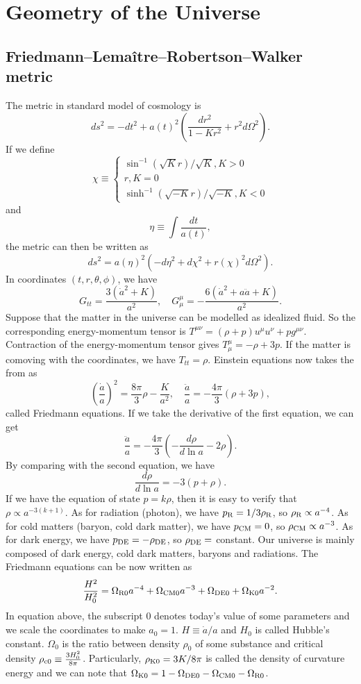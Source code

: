 \chapter{Geometry of the Universe}
\section{Friedmann–Lemaître–Robertson–Walker metric}
The metric in standard model of cosmology is
\[ds^2 = -dt^2 + a(t)^2 \left(\frac{dr^2}{1-Kr^2} + r^2 d\Omega^2 \right).\]
If we define
\[\chi \equiv \begin{cases} 
\sin^{-1}(\sqrt{K}r)/\sqrt{K}, K > 0 \\
r, K = 0 \\
\sinh^{-1}(\sqrt{-K}r)/\sqrt{-K}, K < 0
\end{cases}\]
and
\[\eta \equiv \int \frac{dt}{a(t)},\]
the metric can then be written as
\[ds^2 =  a(\eta)^2 \left(-d\eta^2 + d\chi^2 + r(\chi)^2 d\Omega^2 \right).\]
In coordinates $(t,r,\theta,\phi)$, we have
\[G_{tt} = \frac{3(\dot{a}^2+K)}{a^2}, \quad G^{\mu}_{\mu} = -\frac{6(\dot{a}^2+a\ddot{a}+K)}{a^2}.\]  
Suppose that the matter in the universe can be modelled as idealized fluid. So the corresponding energy-momentum tensor is $T^{\mu\nu} = (\rho + p) u^{\mu} u^{\nu} + pg^{\mu\nu}$. Contraction of the energy-momentum tensor gives $T^{\mu}_{\mu} = -\rho + 3p$. 
If the matter is comoving with the coordinates, we have $T_{tt} = \rho$. Einstein equations now takes the from as
\[\left(\frac{\dot{a}}{a} \right)^2 = \frac{8\pi}{3}\rho - \frac{K}{a^2}, \quad \frac{\ddot{a}}{a} = - \frac{4\pi}{3}(\rho + 3p),\]
called Friedmann equations. If we take the derivative of the first equation, we can get
\[\frac{\ddot{a}}{a} = -\frac{4\pi}{3}\left( - \frac{d\rho}{d \ln a} -2\rho \right).\]
By comparing with the second equation, we have
\[\frac{d\rho}{d \ln a} = -3(p+\rho).\]
If we have the equation of state $p = k\rho$, then it is easy to verify that $\rho \propto a^{-3(k+1)}$.
As for radiation (photon), we have $p_{\rm R} = 1/3 \rho_{\rm R}$, so $\rho_{\rm R} \propto a^{-4}$. As for cold matters (baryon, cold dark matter), we have $p_{\rm CM} = 0$, so $\rho_{\rm CM} \propto a^{-3}$. As for dark energy, we have $p_{\rm DE} = - \rho_{\rm DE}$, so $\rho_{\rm DE} = $ constant. Our universe is mainly composed of dark energy, cold dark matters, baryons and radiations. 
The Friedmann equations can be now written as
\[\frac{H^2}{H_0^2} = \Omega_{\rm R0}a^{-4} + \Omega_{\rm CM0} a^{-3} + \Omega_{\rm DE0} + \Omega_{\rm K0}a^{-2}.\]
In equation above, the subscript $0$ denotes today's value of some parameters and we scale the coordinates to make $a_0 = 1$. 
$H \equiv \dot{a} / a$ and $H_0$ is called Hubble's constant. $\Omega_0$ is the ratio between density $\rho_0$ of some substance and critical density $\rho_{\rm c0} \equiv \frac{3H_0^2}{8\pi}$. Particularly, $\rho_{\rm K0} = 3K/8\pi$ is called the density of curvature energy and we can note that $\Omega_{\rm K0} = 1 - \Omega_{\rm DE0} - \Omega_{\rm CM0} - \Omega_{\rm R0}$.

